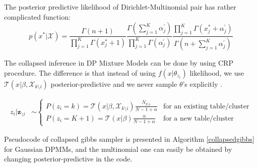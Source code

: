 \documentclass[a4paper]{article}
\begin{document}
The posterior predictive likelihood of Dirichlet-Multinomial pair has rather complicated function:
\begin{equation*}
     p(x^*|\mathcal{X}) = \frac{\Gamma(n+1)}{\prod_{j=1}^{K}\Gamma(x^*_j+1)} \frac{\Gamma(\sum_{j=1}^{K}\alpha^\prime_j)}{\prod_{j=1}^{K}\Gamma(\alpha^\prime_j)} 
     \frac{\prod_{j=1}^{K}\Gamma(x^*_j+\alpha^\prime_j)}{\Gamma(n+\sum_{j=1}^{K}\alpha^\prime_j)}
\end{equation*}

The collapsed inference in DP Mixture Models can be done by using CRP
procedure. The difference is that instead of using \(f(x|\theta_{z_i})\)
likelihood, we use $\mathcal{T}(x|\beta,\mathcal{X}_{k \setminus i})$
posterior-predictive and we never sample \(\theta\)'s
explicitly \cite{kamper2013gibbs}.

\begin{align*}
z_i|\boldsymbol z_{\setminus i}  &\sim \begin{cases}
P(z_i=k)=\mathcal{T}(x|\beta,\mathcal{X}_{k \setminus i})\frac{N_{k\setminus i}}{N-1+\alpha} & \text{for an existing table/cluster} \\
P(z_i=K+1)=\mathcal{T}(x|\beta)\frac{\alpha}{N-1+\alpha} & \text{for a new table/cluster}
\end{cases}
\end{align*}

Pseudocode \cite{kamper2013gibbs} of collapsed gibbs sampler is presented in Algorithm \ref{collapsedgibbs} for Gaussian DPMMs, and the multinomial one can easily be obtained by
changing posterior-predictive in the code.
\end{document}
